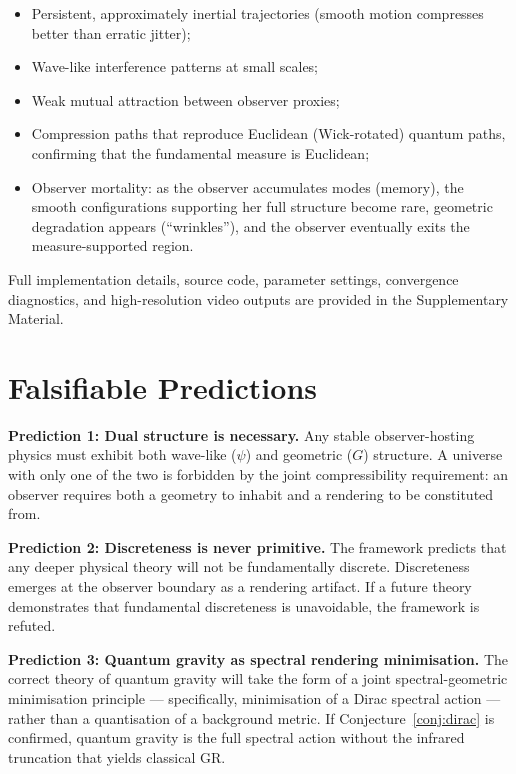 \documentclass[12pt,a4paper]{article}
\begin{document}
\begin{itemize}
  \item Persistent, approximately inertial trajectories (smooth motion
        compresses better than erratic jitter);
  \item Wave-like interference patterns at small scales;
  \item Weak mutual attraction between observer proxies;
  \item Compression paths that reproduce Euclidean (Wick-rotated) quantum
        paths, confirming that the fundamental measure is Euclidean;
  \item Observer mortality: as the observer accumulates modes (memory), the
        smooth configurations supporting her full structure become rare,
        geometric degradation appears (``wrinkles''), and the observer
        eventually exits the measure-supported region.
\end{itemize}

Full implementation details, source code, parameter settings, convergence
diagnostics, and high-resolution video outputs are provided in the
Supplementary Material.

\section{Falsifiable Predictions}
\label{sec:predictions}

\textbf{Prediction 1: Dual structure is necessary.}
Any stable observer-hosting physics must exhibit both wave-like ($\psi$) and
geometric ($G$) structure. A universe with only one of the two is forbidden by
the joint compressibility requirement: an observer requires both a geometry to
inhabit and a rendering to be constituted from.

\textbf{Prediction 2: Discreteness is never primitive.}
The framework predicts that any deeper physical theory will not be
fundamentally discrete. Discreteness emerges at the observer boundary as a
rendering artifact. If a future theory demonstrates that fundamental
discreteness is unavoidable, the framework is refuted.

\textbf{Prediction 3: Quantum gravity as spectral rendering minimisation.}
The correct theory of quantum gravity will take the form of a joint
spectral-geometric minimisation principle --- specifically, minimisation of a
Dirac spectral action --- rather than a quantisation of a background metric.
If Conjecture~\ref{conj:dirac} is confirmed, quantum gravity is the full
spectral action without the infrared truncation that yields classical GR.
\end{document}
